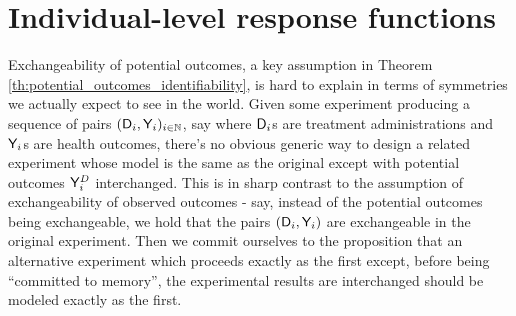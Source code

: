 


\section{Individual-level response functions}\label{sec:ilevel_ccontract}

Exchangeability of potential outcomes, a key assumption in Theorem \ref{th:potential_outcomes_identifiability}, is hard to explain in terms of symmetries we actually expect to see in the world. Given some experiment producing a sequence of pairs $(\mathsf{D}_i,\mathsf{Y}_i)_{i\in\mathbb{N}}$, say where $\mathsf{D}_i$s are treatment administrations and $\mathsf{Y}_i$s are health outcomes, there's no obvious generic way to design a related experiment whose model is the same as the original except with potential outcomes $\mathsf{Y}^D_i$ interchanged. This is in sharp contrast to the assumption of exchangeability of observed outcomes - say, instead of the potential outcomes being exchangeable, we hold that the pairs $(\mathsf{D}_i,\mathsf{Y}_i)$ are exchangeable in the original experiment. Then we commit ourselves to the proposition that an alternative experiment which proceeds exactly as the first except, before being ``committed to memory'', the experimental results are interchanged should be modeled exactly as the first.


